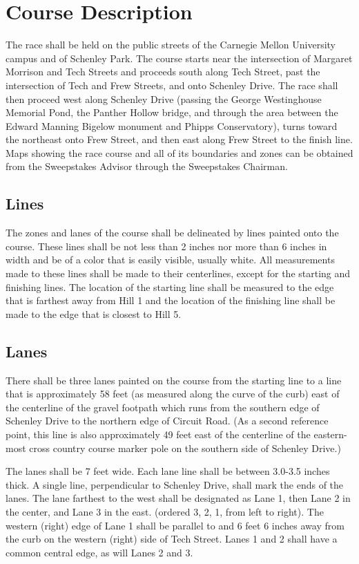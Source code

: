 \chapter{Course Description}

	The race shall be held on the public streets of the Carnegie Mellon University campus and of Schenley Park. The course starts near the intersection of Margaret Morrison and Tech Streets and proceeds south along Tech Street, past the intersection of Tech and Frew Streets, and onto Schenley Drive. The race shall then proceed west along Schenley Drive (passing the George Westinghouse Memorial Pond, the Panther Hollow bridge, and through the area between the Edward Manning Bigelow monument and Phipps Conservatory), turns toward the northeast onto Frew Street, and then east along Frew Street to the finish line. Maps showing the race course and all of its boundaries and zones can be obtained from the Sweepstakes Advisor through the Sweepstakes Chairman.

\section{Lines}

	The zones and lanes of the course shall be delineated by lines painted onto the course. These lines shall be not less than 2 inches nor more than 6 inches in width and be of a color that is easily visible, usually white. All measurements made to these lines shall be made to their centerlines, except for the starting and finishing lines. The location of the starting line shall be measured to the edge that is farthest away from Hill 1 and the location of the finishing line shall be made to the edge that is closest to Hill 5.

\section{Lanes}

	There shall be three lanes painted on the course from the starting line to a line that is approximately 58 feet (as measured along the curve of the curb) east of the centerline of the gravel footpath which runs from the southern edge of Schenley Drive to the northern edge of Circuit Road. (As a second reference point, this line is also approximately 49 feet east of the centerline of the eastern-most cross country course marker pole on the southern side of Schenley Drive.)

	The lanes shall be 7 feet wide. Each lane line shall be between 3.0-3.5 inches thick. A single line, perpendicular to Schenley Drive, shall mark the ends of the lanes. The lane farthest to the west shall be designated as Lane 1, then Lane 2 in the center, and Lane 3 in the east. (ordered 3, 2, 1, from left to right). The western (right) edge of Lane 1 shall be parallel to and 6 feet 6 inches away from the curb on the western (right) side of Tech Street. Lanes 1 and 2 shall have a common central edge, as will Lanes 2 and 3.

